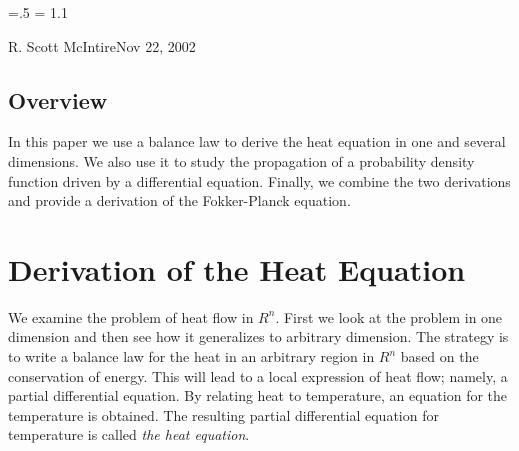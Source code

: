 

\parindent=0pt
\parskip=.5\baselineskip
\baselineskip = 1.1\baselineskip

{R. Scott McIntire}{Nov 22, 2002}

\subsection{Overview}

In this paper we use a balance law to derive the heat equation in one and 
several dimensions. We also use it to study the propagation of a probability
density function driven by a differential equation. Finally, we combine the 
two derivations and provide a derivation of the Fokker-Planck equation.


\section{Derivation of the Heat Equation}

We examine the problem of heat flow in $R^n$. First we look at the 
problem in one dimension and then see how it generalizes to arbitrary
dimension. The strategy is to write a balance law for the heat in 
an arbitrary region in $R^n$ based on the conservation of energy. 
This will lead to a local expression of heat flow;
namely, a partial differential equation. By relating heat to temperature, 
an equation for the temperature is obtained. 
The resulting partial differential equation for temperature is called 
{\it the heat equation\/}.


